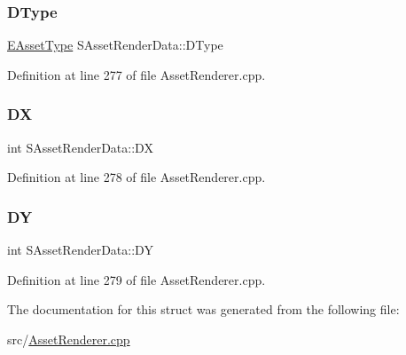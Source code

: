 \subsubsection{\texorpdfstring{D\+Type}{DType}}
{\footnotesize\ttfamily \hyperlink{GameDataTypes_8h_a5600d4fc433b83300308921974477fec}{E\+Asset\+Type} S\+Asset\+Render\+Data\+::\+D\+Type}



Definition at line 277 of file Asset\+Renderer.\+cpp.

\hypertarget{structSAssetRenderData_ab432edfd1146e38a92576b78e2ad5581}{}\label{structSAssetRenderData_ab432edfd1146e38a92576b78e2ad5581} 
\subsubsection{\texorpdfstring{DX}{DX}}
{\footnotesize\ttfamily int S\+Asset\+Render\+Data\+::\+DX}



Definition at line 278 of file Asset\+Renderer.\+cpp.

\hypertarget{structSAssetRenderData_af27e8a46e21a0935983bfc0d34d9ceba}{}\label{structSAssetRenderData_af27e8a46e21a0935983bfc0d34d9ceba} 
\subsubsection{\texorpdfstring{DY}{DY}}
{\footnotesize\ttfamily int S\+Asset\+Render\+Data\+::\+DY}



Definition at line 279 of file Asset\+Renderer.\+cpp.



The documentation for this struct was generated from the following file\+:\begin{DoxyCompactItemize}
\item 
src/\hyperlink{AssetRenderer_8cpp}{Asset\+Renderer.\+cpp}\end{DoxyCompactItemize}

